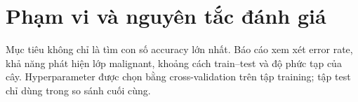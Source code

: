 \section{Phạm vi và nguyên tắc đánh giá}

Mục tiêu không chỉ là tìm con số accuracy lớn nhất. Báo cáo xem xét error rate,
khả năng phát hiện lớp malignant, khoảng cách train--test và độ phức tạp của
cây. Hyperparameter được chọn bằng cross-validation trên tập training; tập test
chỉ dùng trong so sánh cuối cùng.
